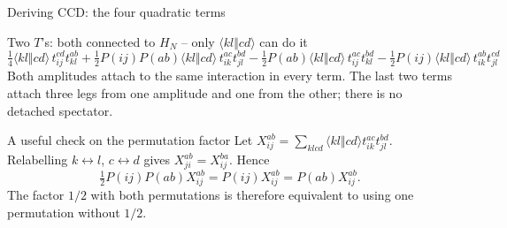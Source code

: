 \documentclass[aspectratio=169,10pt]{beamer}
\newcommand{\as}[4]{\langle #1#2\Vert #3#4\rangle}
\begin{document}
\begin{frame}{Deriving CCD: the four quadratic terms}
\begin{block}{Two $T$'s: both connected to $H_N$ -- only $\as{k}{l}{c}{d}$ can do it}
\[
\tfrac14\as{k}{l}{c}{d}\,t_{ij}^{cd}t_{kl}^{ab}
+\tfrac12P(ij)P(ab)\as{k}{l}{c}{d}\,t_{ik}^{ac}t_{jl}^{bd}
-\tfrac12P(ab)\as{k}{l}{c}{d}\,t_{ij}^{ac}t_{kl}^{bd}
-\tfrac12P(ij)\as{k}{l}{c}{d}\,t_{ik}^{ab}t_{jl}^{cd}
\]
Both amplitudes attach to the same interaction in every term. The last two terms attach three legs from one amplitude and one from the other; there is no detached spectator.
\end{block}

\begin{block}{A useful check on the permutation factor}
Let $X_{ij}^{ab}=\sum_{klcd}\langle kl\Vert cd\rangle t_{ik}^{ac}t_{jl}^{bd}$. Relabelling $k\leftrightarrow l$, $c\leftrightarrow d$ gives $X_{ji}^{ab}=X_{ij}^{ba}$. Hence
\[
 \tfrac12P(ij)P(ab)X_{ij}^{ab}=P(ij)X_{ij}^{ab}=P(ab)X_{ij}^{ab}.
\]
The factor $1/2$ with both permutations is therefore equivalent to using one permutation without $1/2$.
\end{block}
\end{frame}
\end{document}
